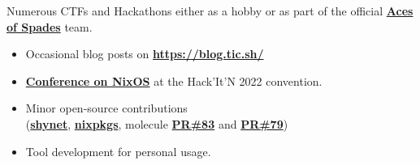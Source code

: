 \documentclass[10pt,a4paper,ragged2e,withhyper]{altacv}
\begin{document}
\begin{paracol}{2}
\medskip


  Numerous CTFs and Hackathons either as a hobby or as part of the official \href{https://www.capgemini.com/fr-fr/perspectives/publications/les-aces-of-spades-lequipe-de-capture-the-flag-de-capgemini/}{\bf{Aces of Spades}} team.

  \divider

  \begin{itemize}
    \item Occasional blog posts on \href{https://blog.tic.sh}{\bf{https://blog.tic.sh/}}
    \item \href{https://youtu.be/GpJdcgxwxVE?t=23867}{\bf{Conference on NixOS}} at the Hack'It'N 2022 convention.
  \end{itemize}

  \divider

  \begin{itemize}
    \item Minor open-source contributions \\
      (\href{https://github.com/milesmcc/shynet/pull/236}{\bf{shynet}}, \href{https://github.com/NixOS/nixpkgs/pull/259785}{\bf{nixpkgs}}, molecule \href{https://github.com/ansible-community/molecule-podman/pull/83}{\bf{PR\#83}} and \href{https://github.com/ansible-community/molecule-podman/pull/79}{\bf{PR\#79}})
    \item Tool development for personal usage.
  \end{itemize}





\end{paracol}
\end{document}
